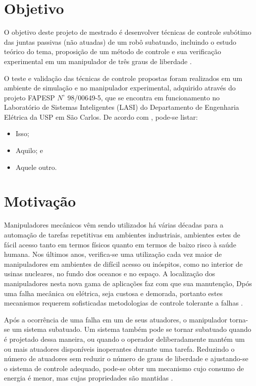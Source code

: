 \section{Objetivo}
O objetivo deste projeto de mestrado é desenvolver técnicas de controle subótimo das juntas passivas (não atuadas) de um robô subatuado, incluindo o estudo teórico do tema, proposição de um método de controle e sua verificação
experimental em um manipulador de três graus de liberdade \cite{Nascimento1970}.

O teste \cite{Patagonios2001} e validação das técnicas de controle propostas foram realizados em um ambiente de simulação e no manipulador
experimental, adquirido através do projeto FAPESP $N^{\circ}$ 98/00649-5, que se encontra em funcionamento no Laboratório de Sistemas Inteligentes (LASI) do Departamento de Engenharia Elétrica da USP em São Carlos. De acordo com , pode-se listar:
\begin{itemize}
\item Isso;
\item Aquilo; e
\item Aquele outro.
\end{itemize}

\section{Motivação}
Manipuladores mecânicos \cite{Sbornian2002} vêm sendo utilizados há várias décadas para a automação de tarefas
repetitivas em ambientes industriais, ambientes estes de fácil acesso tanto em termos físicos quanto em termos de baixo
risco à saúde humana. Nos últimos anos, verifica-se uma utilização cada vez maior de manipuladores em
ambientes de difícil acesso ou inóspitos, como no interior de usinas nucleares, no fundo dos oceanos e no
espaço. A localização dos manipuladores nesta nova gama de aplicações faz com que sua manutenção,
Dpós uma falha mecânica ou elétrica, seja custosa e demorada, portanto estes mecanismos requerem sofisticadas
metodologias de controle tolerante a falhas \cite{ITALUS2004}.

Após a ocorrência de uma falha em um de seus atuadores, o manipulador torna-se um sistema subatuado. Um sistema também pode se tornar subatuado quando é projetado  dessa maneira, ou quando o operador deliberadamente mantém um ou mais atuadores disponíveis inoperantes durante uma tarefa. Reduzindo o número de atuadores sem reduzir o número de graus de
liberdade e ajustando-se o sistema de controle adequado, pode-se obter um mecanismo cujo consumo de energia é menor, mas cujas propriedades são mantidas \cite{Arystides1994}.

